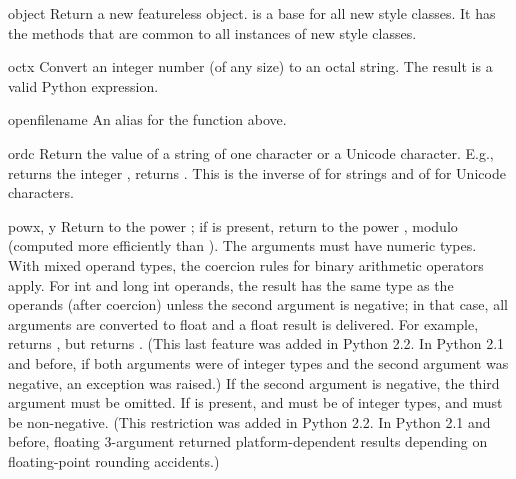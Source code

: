 \begin{funcdesc}{object}{}
  Return a new featureless object.   is a base
  for all new style classes.  It has the methods that are common
  to all instances of new style classes.

\end{funcdesc}

\begin{funcdesc}{oct}{x}
  Convert an integer number (of any size) to an octal string.  The
  result is a valid Python expression.
\end{funcdesc}

\begin{funcdesc}{open}{filename}
  An alias for the  function above.
\end{funcdesc}

\begin{funcdesc}{ord}{c}
  Return the \ASCII{} value of a string of one character or a Unicode
  character.  E.g.,  returns the integer ,
   returns .  This is the inverse of
   for strings and of  for Unicode
  characters.
\end{funcdesc}

\begin{funcdesc}{pow}{x, y}
  Return  to the power ; if  is present, return
   to the power , modulo  (computed more
  efficiently than ).  The
  arguments must have numeric types.  With mixed operand types, the
  coercion rules for binary arithmetic operators apply.  For int and
  long int operands, the result has the same type as the operands
  (after coercion) unless the second argument is negative; in that
  case, all arguments are converted to float and a float result is
  delivered.  For example,  returns , but
   returns .  (This last feature was added in
  Python 2.2.  In Python 2.1 and before, if both arguments were of integer
  types and the second argument was negative, an exception was raised.)
  If the second argument is negative, the third argument must be omitted.
  If  is present,  and  must be of integer types,
  and  must be non-negative.  (This restriction was added in
  Python 2.2.  In Python 2.1 and before, floating 3-argument 
  returned platform-dependent results depending on floating-point
  rounding accidents.)
\end{funcdesc}

